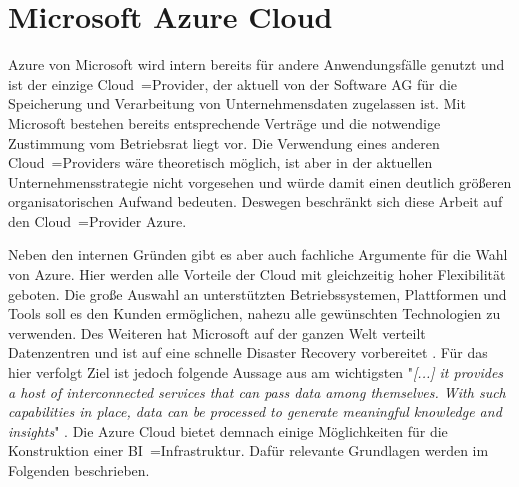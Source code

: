 \section{Microsoft Azure Cloud} \label{sec:grundlagen:bi_in_der_cloud_mit_azure}
Azure von Microsoft wird intern bereits für andere Anwendungsfälle genutzt und ist der einzige Cloud~=Provider, der aktuell von der Software AG für die Speicherung und Verarbeitung von Unternehmensdaten zugelassen ist. Mit Microsoft bestehen bereits entsprechende Verträge und die notwendige Zustimmung vom Betriebsrat liegt vor. Die Verwendung eines anderen Cloud~=Providers wäre theoretisch möglich, ist aber in der aktuellen Unternehmensstrategie nicht vorgesehen und würde damit einen deutlich größeren organisatorischen Aufwand bedeuten. Deswegen beschränkt sich diese Arbeit auf den Cloud~=Provider Azure.

Neben den internen Gründen gibt es aber auch fachliche Argumente für die Wahl von Azure. Hier werden alle Vorteile der Cloud mit gleichzeitig hoher Flexibilität geboten. Die große Auswahl an unterstützten Betriebssystemen, Plattformen und Tools soll es den Kunden ermöglichen, nahezu alle gewünschten Technologien zu verwenden. Des Weiteren hat Microsoft auf der ganzen Welt verteilt Datenzentren und ist auf eine schnelle Disaster Recovery vorbereitet \cite{modi_azure_2020}. Für das hier verfolgt Ziel ist jedoch folgende Aussage aus  am wichtigsten "\textit{[...] it provides a host of interconnected services that can pass data among themselves. With such capabilities in place, data can be processed to generate meaningful knowledge and insights}" \cite{modi_azure_2020}. Die Azure Cloud bietet demnach einige Möglichkeiten für die Konstruktion einer BI~=Infrastruktur. Dafür relevante Grundlagen werden im Folgenden beschrieben.

